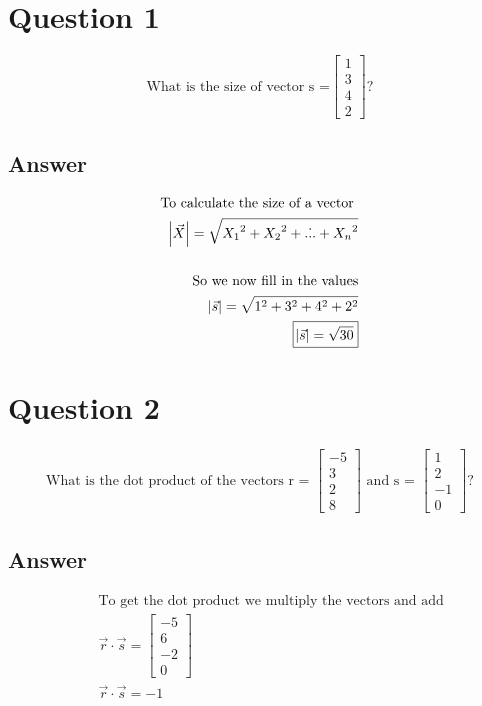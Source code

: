 \documentclass[12pt]{article}
\begin{document}
\section*{Question 1}
	\[
            \text{What is the size of vector s =}
            \begin{bmatrix}
                1 \\ 3 \\ 4 \\ 2
            \end{bmatrix}
            \text{?}
    \]
\subsection*{Answer}
    \begin{align*}
        \text{To calculate the size of a vector } \\
        \abs{\vec{X}} = \sqrt{{X_1}^2 + {X_2}^2 + \dot{...} + {X_n}^2} \\
        \\
        \text{So we now fill in the values}
        \\
        \abs{\vec{s}} = \sqrt{1^2 + 3^2 + 4^2 + 2^2} \\
        \boxed{\abs{\vec{s}} = \sqrt{30}}
    \end{align*}

\section*{Question 2}
    \begin{align*}
        \text{What is the dot product of the vectors r = }
        \begin{bmatrix}
            -5 \\ 3 \\ 2 \\ 8
        \end{bmatrix}
        \text{ and s = }
        \begin{bmatrix}
            1 \\ 2 \\ -1 \\ 0
        \end{bmatrix}
        \text{?}
    \end{align*}

\subsection*{Answer}
    \begin{eqnarray*}
        & &\text{To get the dot product we multiply the vectors and add} \\
        & &\vec{r} \cdot \vec{s} =
        \begin{bmatrix}
            -5 \\ 6 \\ -2 \\ 0
        \end{bmatrix} \\
        & &\boxed{\vec{r} \cdot \vec{s} = -1}
    \end{eqnarray*}
\end{document}
